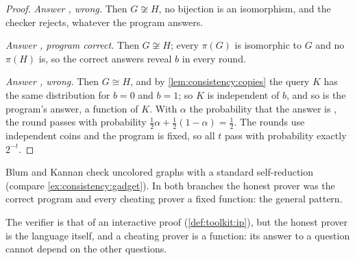 \begin{refsection}
\begin{proof}
\emph{Answer \consistencyyes, wrong.} Then $G\not\cong H$, no bijection is an isomorphism, and the checker rejects, whatever the program answers.

\emph{Answer \consistencyno, program correct.} Then $G\not\cong H$; every $\pi(G)$ is isomorphic to $G$ and no $\pi(H)$ is, so the correct answers reveal $b$ in every round.

\emph{Answer \consistencyno, wrong.} Then $G\cong H$, and by \cref{lem:consistency:copies} the query $K$ has the same distribution for $b=0$ and $b=1$; so $K$ is independent of $b$, and so is the program's answer, a function of $K$. With $\alpha$ the probability that the answer is \consistencyyes, the round passes with probability $\frac12\alpha+\frac12(1-\alpha)=\frac12$. The rounds use independent coins and the program is fixed, so all $t$ pass with probability exactly $2^{-t}$.
\end{proof}

Blum and Kannan check uncolored graphs with a standard self-reduction (compare \cref{ex:consistency:gadget}). In both branches the honest prover was the correct program and every cheating prover a fixed function: the general pattern.


The verifier is that of an interactive proof (\cref{def:toolkit:ip}), but the honest prover is the language itself, and a cheating prover is a function: its answer to a question cannot depend on the other questions.


\end{refsection}
